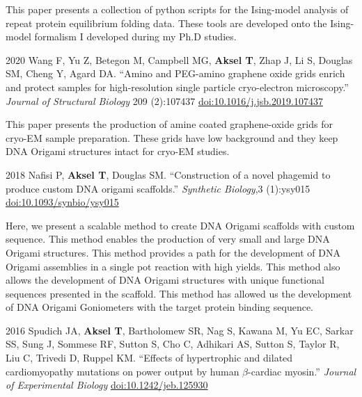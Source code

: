 \documentclass[12pt,letterpaper]{report}
\begin{document}
\begin{tablist}
        \begin{addmargin}[1cm]{0cm}
            This paper presents a collection of python scripts for the Ising-model analysis of repeat protein equilibrium folding data. These tools are developed onto the Ising-model formalism I developed during my Ph.D studies.  
        \end{addmargin}
        
        \item[2020] \tab{}Wang F, Yu Z, Betegon M, Campbell MG, \textbf{Aksel T}, Zhap J, Li S, Douglas SM, Cheng Y, Agard DA. \enquote{Amino and PEG-amino graphene oxide grids enrich and protect samples for high-resolution single particle cryo-electron microscopy.} \textit{Journal of Structural Biology} 209 (2):107437 \href{https://doi.org/10.1016/j.jsb.2019.107437}{doi:10.1016/j.jsb.2019.107437}

        \begin{addmargin}[1cm]{0cm}
            This paper presents the production of amine coated graphene-oxide grids for cryo-EM sample preparation. These grids have low background and they keep DNA Origami structures intact for cryo-EM studies. 
        \end{addmargin}

        \item[2018] \tab{}Nafisi P, \textbf{Aksel T}, Douglas SM. \enquote{Construction of a novel phagemid to produce custom DNA origami scaffolds.} \textit{Synthetic Biology},3 (1):ysy015 \href{https://doi.org/10.1093/synbio/ysy015}{doi:10.1093/synbio/ysy015}

        \begin{addmargin}[1cm]{0cm}
            Here, we present a scalable method to create DNA Origami scaffolds with custom sequence. This method enables the production of very small and large DNA Origami structures. This method provides a path for the development of DNA Origami assemblies in a single pot reaction with high yields. This method also allows the development of DNA Origami structures with unique functional sequences presented in the scaffold. This method has allowed us the development of DNA Origami Goniometers with the target protein binding sequence.    
        \end{addmargin}

        \item[2016] \tab{}Spudich JA, \textbf{Aksel T}, Bartholomew SR, Nag S, Kawana M, Yu EC, Sarkar SS, Sung J, Sommese RF, Sutton S, Cho C, Adhikari AS, Sutton S, Taylor R, Liu C, Trivedi D, Ruppel KM. \enquote{Effects of hypertrophic and dilated cardiomyopathy mutations on power output by human $\beta$-cardiac myosin.} \textit{Journal of Experimental Biology} \href{https://doi.org/10.1242/jeb.125930}{doi:10.1242/jeb.125930}
        

\end{tablist}
\end{document}

